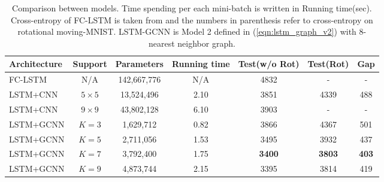 \documentclass{article} %
\newcommand{\eqnref}[1]{(\ref{eqn:#1})}
\begin{document}
\begin{table}
	\centering
	\begin{tabular}{lcccccc}
		\toprule
		Architecture & Support & Parameters & Running time & Test(w/o Rot) & Test(Rot) & Gap\\
		\midrule
		FC-LSTM & N/A & 142,667,776 & N/A & 4832 & - & -\\
		LSTM+CNN & $5 \times 5$ & 13,524,496 & 2.10 & 3851 & 4339 & 488 \\
		LSTM+CNN & $9 \times 9$ & 43,802,128 & 6.10 & 3903 & - & - \\
		LSTM+GCNN & $K=3$ & 1,629,712 & 0.82 & 3866 & 4367 & 501 \\
		LSTM+GCNN & $K=5$ & 2,711,056 & 1.53 & 3495 & 3932 & 437 \\
		LSTM+GCNN & $K=7$ & 3,792,400 & 1.75 & {\bf 3400} & {\bf 3803} & {\bf 403}\\
		LSTM+GCNN & $K=9$ & 4,873,744 & 2.15 & 3395 & 3814 & 419 \\
		\bottomrule
	\end{tabular}
	\caption{Comparison between models. Time spending per each mini-batch is written in Running time(sec). Cross-entropy of FC-LSTM is taken from \cite{convlstm} and the numbers in parenthesis refer to cross-entropy on rotational moving-MNIST. LSTM-GCNN is Model 2 defined in \eqnref{lstm_graph_v2} with 8-nearest neighbor graph.}
	\label{tab:moving_mnist}
\end{table}
\end{document}
